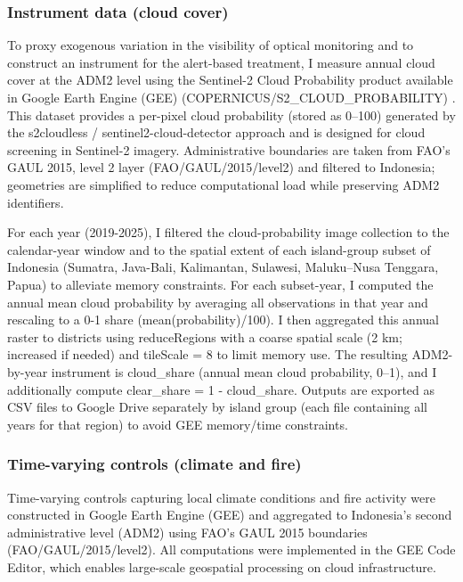 \documentclass[hidelinks,12pt]{article}
\begin{document}
\subsubsection{Instrument data (cloud cover)}

To proxy exogenous variation in the visibility of optical monitoring and to construct an instrument for the alert-based treatment, I measure annual cloud cover at the ADM2 level using the Sentinel-2 Cloud Probability product available in Google Earth Engine (GEE) (COPERNICUS/S2\_CLOUD\_PROBABILITY) \citep{copernicus_nd_s2_cloud_probability_gee,gorelick2017gee}. This dataset provides a per-pixel cloud probability (stored as 0–100) generated by the s2cloudless / sentinel2-cloud-detector approach and is designed for cloud screening in Sentinel-2 imagery. Administrative boundaries are taken from FAO’s GAUL 2015, level 2 layer (FAO/GAUL\allowbreak/2015/level2) and filtered to Indonesia; geometries are simplified to reduce computational load while preserving ADM2 identifiers.

For each year (2019-2025), I filtered the cloud-probability image collection to the calendar-year window and to the spatial extent of each island-group subset of Indonesia (Sumatra, Java-Bali, Kalimantan, Sulawesi, Maluku–Nusa Tenggara, Papua) to alleviate memory constraints. For each subset-year, I computed the annual mean cloud probability by averaging all observations in that year and rescaling to a 0-1 share (mean(probability)/100). I then aggregated this annual raster to districts using reduceRegions with a coarse spatial scale (2 km; increased if needed) and tileScale = 8 to limit memory use. The resulting ADM2-by-year instrument is cloud\_share (annual mean cloud probability, 0–1), and I additionally compute clear\_share = 1 - cloud\_share. Outputs are exported as CSV files to Google Drive separately by island group (each file containing all years for that region) to avoid GEE memory/time constraints.

\subsubsection{Time-varying controls (climate and fire)}

Time-varying controls capturing local climate conditions and fire activity were constructed in Google Earth Engine (GEE) and aggregated to Indonesia’s second administrative level (ADM2) using FAO’s GAUL 2015 boundaries (FAO/GAUL/2015/level2). All computations were implemented in the GEE Code Editor, which enables large-scale geospatial processing on cloud infrastructure.
\end{document}
